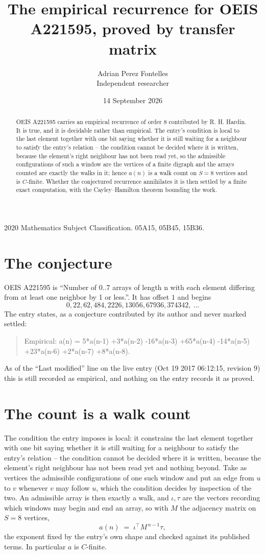 \documentclass[11pt,a4paper]{article}
\title{The empirical recurrence for OEIS A221595, proved by transfer matrix}
\author{Adrian Perez Fontelles\\ \small Independent researcher}
\date{14 September 2026}
\theoremstyle{plain}
\theoremstyle{definition}
\begin{document}
\maketitle

\begin{abstract}
OEIS A221595 carries an empirical recurrence of order $8$ contributed by R. H. Hardin. It is
true, and it is decidable rather than empirical. The entry's condition is local to the last element together with one bit saying whether it is still waiting for a neighbour to satisfy the entry's relation -- the condition cannot be decided where it is written, because the element's right neighbour has not been read yet, so
the admissible configurations of such a window are the vertices of a finite digraph and the
arrays counted are exactly the walks in it; hence $a(n)$ is a walk count on $S=8$ vertices
and is $C$-finite. Whether the conjectured recurrence annihilates it is then settled by a
finite exact computation, with the Cayley--Hamilton theorem bounding the work.
\end{abstract}

\noindent\small 2020 Mathematics Subject Classification. 05A15, 05B45, 15B36.\normalsize

\section{The conjecture}

OEIS A221595 is ``Number of 0..7 arrays of length n with each element differing from at least one neighbor by 1 or less.''. It has offset $1$ and begins
\[
0, 22, 62, 484, 2226, 13056, 67936, 374342,\ \dots
\]
The entry states, as a conjecture contributed by its author and never marked settled:
\begin{quote}
Empirical: a(n) = 5*a(n-1) +3*a(n-2) -16*a(n-3) +65*a(n-4) -14*a(n-5) +23*a(n-6) +2*a(n-7) +8*a(n-8).
\end{quote}
As of the ``Last modified'' line on the live entry (Oct 19 2017 06:12:15, revision 9) this is still
recorded as empirical, and nothing on the entry records it as proved.

\section{The count is a walk count}

The condition the entry imposes is local: it constrains the last element together with one bit saying whether it is still waiting for a neighbour to satisfy the entry's relation -- the condition cannot be decided where it is written, because the element's right neighbour has not been read yet and nothing beyond. Take as vertices the admissible configurations of one such window and put an edge from $u$ to $v$ whenever $v$ may follow $u$, which the condition decides by inspection of the two.
An admissible array is then exactly a walk, and $\iota,\tau$ are the vectors recording which windows may begin and end an array, so with $M$ the adjacency matrix on $S=8$ vertices,
\[
a(n)\;=\;\iota^{\!\top}M^{\,n-1}\tau ,
\]
the exponent fixed by the entry's own shape and checked against its published terms. In
particular $a$ is $C$-finite.
\end{document}
